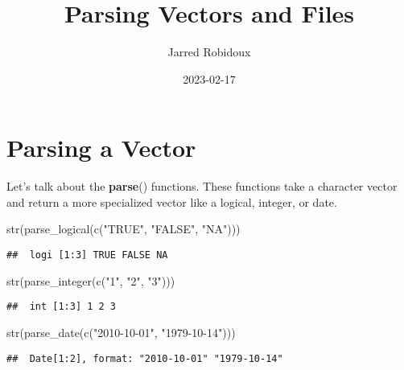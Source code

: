 \documentclass[
]{article}
\title{Parsing Vectors and Files}
\author{Jarred Robidoux}
\date{2023-02-17}
\newenvironment{Shaded}{\begin{snugshade}}{\end{snugshade}}
\newcommand{\FunctionTok}[1]{\textcolor[rgb]{0.00,0.00,0.00}{#1}}
\newcommand{\NormalTok}[1]{#1}
\newcommand{\StringTok}[1]{\textcolor[rgb]{0.31,0.60,0.02}{#1}}
\begin{document}
\maketitle

\hypertarget{parsing-a-vector}{%
\section{\texorpdfstring{\textbf{Parsing a
Vector}}{Parsing a Vector}}\label{parsing-a-vector}}

Let's talk about the \textbf{parse}() functions. These functions take a
character vector and return a more specialized vector like a logical,
integer, or date.

\begin{Shaded}
\begin{Highlighting}[]
\FunctionTok{str}\NormalTok{(}\FunctionTok{parse\_logical}\NormalTok{(}\FunctionTok{c}\NormalTok{(}\StringTok{"TRUE"}\NormalTok{, }\StringTok{"FALSE"}\NormalTok{, }\StringTok{"NA"}\NormalTok{)))}
\end{Highlighting}
\end{Shaded}

\begin{verbatim}
##  logi [1:3] TRUE FALSE NA
\end{verbatim}

\begin{Shaded}
\begin{Highlighting}[]
\FunctionTok{str}\NormalTok{(}\FunctionTok{parse\_integer}\NormalTok{(}\FunctionTok{c}\NormalTok{(}\StringTok{"1"}\NormalTok{, }\StringTok{"2"}\NormalTok{, }\StringTok{"3"}\NormalTok{)))}
\end{Highlighting}
\end{Shaded}

\begin{verbatim}
##  int [1:3] 1 2 3
\end{verbatim}

\begin{Shaded}
\begin{Highlighting}[]
\FunctionTok{str}\NormalTok{(}\FunctionTok{parse\_date}\NormalTok{(}\FunctionTok{c}\NormalTok{(}\StringTok{"2010{-}10{-}01"}\NormalTok{, }\StringTok{"1979{-}10{-}14"}\NormalTok{)))}
\end{Highlighting}
\end{Shaded}

\begin{verbatim}
##  Date[1:2], format: "2010-10-01" "1979-10-14"
\end{verbatim}
\end{document}
